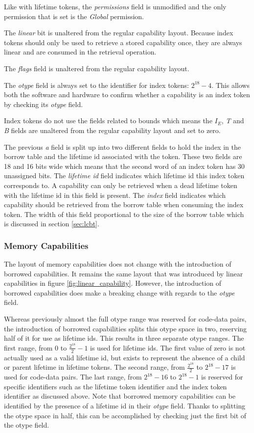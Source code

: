 Like with lifetime tokens, the \textit{permissions} field is unmodified and the only permission that is set is the \textit{Global} permission.

The \textit{linear} bit is unaltered from the regular capability layout. Because index tokens should only be used to retrieve a stored capability once, they are always linear and are consumed in the retrieval operation.

The \textit{flags} field is unaltered from the regular capability layout.

The \textit{otype} field is always set to the identifier for index tokens: $2^{18} - 4$. This allows both the software and hardware to confirm whether a capability is an index token by checking its \textit{otype} field.

Index tokens do not use the fields related to bounds which means the $I_E$, \textit{T} and \textit{B} fields are unaltered from the regular capability layout and set to zero.

The previous \textit{a} field is split up into two different fields to hold the index in the borrow table and the lifetime id associated with the token. These two fields are 18 and 16 bits wide which means that the second word of an index token has 30 unassigned bits. The \textit{lifetime id} field indicates which lifetime id this index token corresponds to. A capability can only be retrieved when a dead lifetime token with the lifetime id in this field is present. The \textit{index} field indicates which capability should be retrieved from the borrow table when consuming the index token. The width of this field proportional to the size of the borrow table which is discussed in section \ref{sec:lcbt}.

\subsubsection{Memory Capabilities}
The layout of memory capabilities does not change with the introduction of borrowed capabilities. It remains the same layout that was introduced by linear capabilities in figure \ref{fig:linear_capability}. However, the introduction of borrowed capabilities does make a breaking change with regards to the \textit{otype} field.

Whereas previously almost the full otype range was reserved for code-data pairs, the introduction of borrowed capabilities splits this otype space in two, reserving half of it for use as lifetime ids. This results in three separate otype ranges. The first range, from 0 to $\frac{2^{18}}{2} - 1$ is used for lifetime ids. The first value of zero is not actually used as a valid lifetime id, but exists to represent the absence of a child or parent lifetime in lifetime tokens. The second range, from  $\frac{2^{18}}{2}$ to $2^{18} - 17$ is used for code-data pairs. The last range, from $2^{18} - 16$ to $2^{18} - 1$ is reserved for specific identifiers such as the lifetime token identifier and the index token identifier as discussed above. Note that borrowed memory capabilities can be identified by the presence of a lifetime id in their \textit{otype} field. Thanks to splitting the otype space in half, this can be accomplished by checking just the first bit of the otype field.

